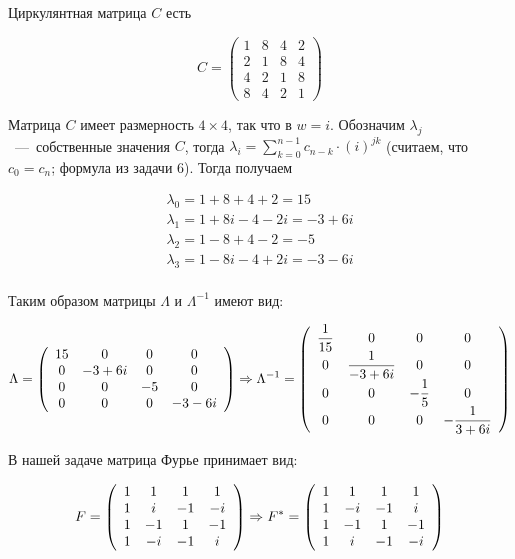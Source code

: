 \documentclass[a4paper,12pt]{article}
\begin{document}
\begin{solution}
	Циркулянтная матрица $C$ есть
	
	\begin{equation*}
	C = \left(
	\begin{array}{cccc}
	1 & 8 & 4 & 2\\
	2 & 1 & 8 & 4\\
	4 & 2 & 1 & 8\\
	8 & 4 & 2 & 1
	\end{array}
	\right)
	\end{equation*}
	
	Матрица $C$ имеет размерность $4\times4$, так что в $w = i$. Обозначим $\lambda_j$~---~собственные значения $C$, тогда $\lambda_i = \displaystyle \sum_{k = 0}^{n-1} c_{n-k} \cdot (i)^{jk}$ (считаем, что $c_0 = c_n$; формула из задачи 6). Тогда получаем
	
	\begin{gather*}
	\lambda_0 = 1 + 8 + 4 + 2 =15\\
	\lambda_1=1+8i-4-2i=-3+6i\\
	\lambda_2=1-8+4-2=-5\\
	\lambda_3=1-8i-4+2i=-3-6i\\
	\end{gather*}
	
	Таким образом матрицы $\Lambda$ и $\Lambda^{-1}$ имеют вид:
	
	
	\begin{equation*}
	\Lambda = \left(
	\begin{array}{cccc}
	15 & 0 & 0 & 0\\
	0 & -3+6i & 0 & 0\\
	0 & 0 & -5 & 0\\
	0 & 0 & 0 & -3-6i
	\end{array}
	\right) \Rightarrow
	\Lambda^{-1} = \left(
	\begin{array}{cccc}
	\dfrac{1}{15} & 0 & 0 & 0\\
	0 & \dfrac{1}{-3+6i} & 0 & 0\\
	0 & 0 & -\dfrac{1}{5} & 0\\
	0 & 0 & 0 & -\dfrac{1}{3+6i}
	\end{array}
	\right)
	\end{equation*}
	
	В нашей задаче матрица Фурье принимает вид:
	
	\begin{equation*}
	F = \left(
	\begin{array}{cccc}
	1 & 1 & 1 & 1\\
	1 & i & -1 & -i\\
	1 & -1 & 1 & -1\\
	1 & -i & -1 & i
	\end{array}
	\right) \Rightarrow
	F^{*} = \left(
	\begin{array}{cccc}
	1 & 1 & 1 & 1\\
	1 & -i & -1 & i\\
	1 & -1 & 1 & -1\\
	1 & i & -1 & -i
	\end{array}
	\right)
	\end{equation*}


\end{solution}
\end{document}
